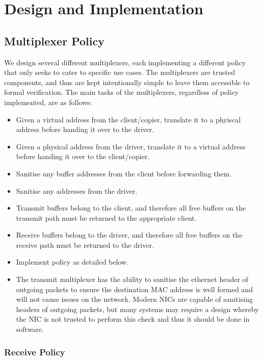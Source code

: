 \chapter{Design and Implementation}\label{ch:design}

\section{Multiplexer Policy}

We design several different multiplexers, each implementing a different policy
that only seeks to cater to specific use cases. The multiplexers are trusted components,
and thus are kept intentionally simple to leave them accessible to formal verification.
The main tasks of the multiplexers, regardless of policy implemented, are as follows:

\begin{itemize}
    \item Given a virtual address from the client/copier, translate it to a phyiscal address before
            handing it over to the driver.
    \item Given a physical address from the driver, translate it to a virtual address before
            handing it over to the client/copier.
    \item Sanitise any buffer addresses from the client before forwarding them.
    \item Sanitise any addresses from the driver. 
    \item Transmit buffers belong to the client, and therefore all free buffers on the transmit path
            must be returned to the appropriate client.
    \item Receive buffers belong to the driver, and therefore all free buffers on the receive path
            must be returned to the driver.
    \item Implement policy as detailed below.
    \item The transmit multiplexer has the ability to sanitise the ethernet header of outgoing packets
          to ensure the destination MAC address is well formed and will not cause issues
          on the network. Modern NICs are capable of sanitising headers of outgoing packets,
          but many systems may require a design whereby the NIC is not trusted to perform this check 
          and thus it should be done in software.
\end{itemize}

\subsection{Receive Policy}\label{s:rx_policy}

